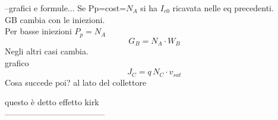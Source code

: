 --grafici e formule...
%
Se Pp=cost=$N_A$ si ha $I_{c0}$ ricavata nelle eq precedenti.\\
GB cambia con le iniezioni.
\\
Per basse iniezioni $P_p=N_A$\\
\begin{equation}
    G_B=N_A \cdot W_{B}
\end{equation}
Negli altri casi cambia.\\
grafico\\
\begin{equation}
    J_C=q \, N_C \cdot v_{sat}
\end{equation}
%
Cosa succede poi? al lato del collettore

questo è detto effetto kirk\\
------------------------------------\\
\cleardoublepage
